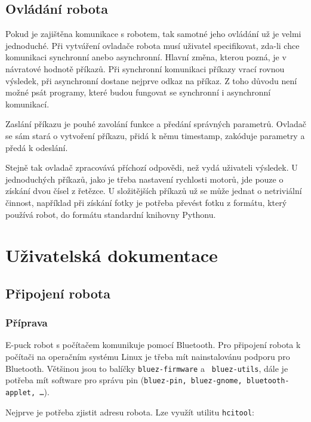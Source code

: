 \documentclass[12pt,notitlepage]{report}
\begin{document}
    \section{Ovládání robota}
    \label{controller}

    Pokud je zajištěna komunikace s robotem, tak samotné jeho ovládání už je
    velmi jednoduché. Při vytváření ovladače robota musí uživatel specifikovat,
    zda-li chce komunikaci synchronní anebo asynchronní. Hlavní změna, kterou
    pozná, je v návratové hodnotě příkazů. Při synchronní komunikaci příkazy
    vrací rovnou výsledek, při asynchronní dostane nejprve odkaz na příkaz. Z
    toho důvodu není možné psát programy, které budou fungovat se synchronní i
    asynchronní komunikací.

    Zaslání příkazu je pouhé zavolání funkce a předání správných parametrů.
    Ovladač se sám stará o vytvoření příkazu, přidá k němu timestamp, zakóduje
    parametry a předá k odeslání.

    Stejně tak ovladač zpracovává příchozí odpovědi, než vydá uživateli
    výsledek. U jednoduchých příkazů, jako je třeba nastavení rychlosti motorů,
    jde pouze o získání dvou čísel z řetězce. U složitějších příkazů už se může
    jednat o netriviální činnost, například při získání fotky je potřeba
    převést fotku z formátu, který používá robot, do formátu standardní
    knihovny Pythonu.

\chapter{Uživatelská dokumentace}

    \section{Připojení robota}

    \subsection{Příprava}

    E-puck robot s počítačem komunikuje pomocí Bluetooth. Pro připojení robota
    k počítači na operačním systému Linux je třeba mít nainstalovánu podporu
    pro Bluetooth. Většinou jsou to balíčky {\tt bluez-firmware} a {\tt
    bluez-utils}, dále je potřeba mít software pro správu pin ({\tt bluez-pin,
    bluez-gnome, bluetooth-applet, \ldots}).

    Nejprve je potřeba zjistit adresu robota. Lze využít utilitu {\tt hcitool}:
\end{document}
